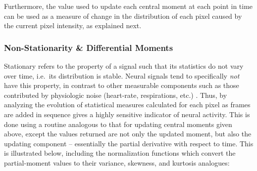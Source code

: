 \documentclass[../main.tex]{subfiles}
\begin{document}



Furthermore, the value used to update each central moment at each point in time can be used as a measure of change in the distribution of each pixel caused by the current pixel intensity, as explained next.

\subsubsection{Non-Stationarity \& Differential Moments}\label{sec:non-stationarity-differential-moments}

Stationary refers to the property of a signal such that its statistics do not vary over time, i.e.~its distribution is stable.
Neural signals tend to specifically \emph{not} have this property, in contrast to other measurable components such as those contributed by physiologic noise (heart-rate, respirations, etc.)
.
Thus, by analyzing the evolution of statistical measures calculated for each pixel as frames are added in sequence gives a highly sensitive indicator of neural activity.
This is done using a routine analogous to that for updating central moments given above, except the values returned are not only the updated moment, but also the updating component -- essentially the partial derivative with respect to time.
This is illustrated below, including the normalization functions which convert the partial-moment values to their variance, skewness, and kurtosis analogues:
\end{document}
